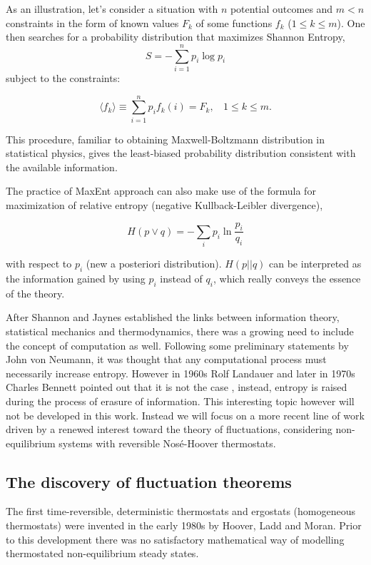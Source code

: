 \documentclass[a4paper,12pt]{article}
\begin{document}
As an illustration, let's consider a situation with $n$ potential outcomes and $m<n$ constraints in the form of known values $F_k$ of some functions $f_k$ ($1 \leq k \leq m$).
One then searches for a probability distribution that maximizes Shannon Entropy,
\begin{equation}
  S=-\sum_{i=1}^n p_i \log p_i
\end{equation}
subject to the constraints:

\begin{equation}
  \langle f_k \rangle \equiv \sum_{i=1}^n p_i f_k(i)=F_k,\ \ \ \  1\leq k \leq m.
\end{equation}

This procedure, familiar to obtaining Maxwell-Boltzmann distribution in statistical physics, gives the least-biased probability distribution consistent with the available information.

The practice of MaxEnt approach can also make use of the formula for maximization of relative entropy (negative Kullback-Leibler divergence),

\begin{equation}
\label{Kullback-Leibler}
    H(p\lor q) = -\sum_i p_i \ln \frac{p_i}{q_i}
\end{equation}


with respect to $p_i$ (new a posteriori distribution). $H(p||q)$ can be interpreted as the information gained by using $p_i$ instead of $q_i$, which really conveys the essence of the theory.


After Shannon and Jaynes established the links between information theory, statistical mechanics and thermodynamics, there was a growing need to include the concept of computation as well. Following some preliminary statements by John von Neumann, it was thought that any computational process must necessarily increase entropy.
However in 1960s Rolf Landauer and later in 1970s Charles Bennett pointed out that it is not the case \cite{Landauer:2002wc, Bennett:1973ko}, instead, entropy is raised during the process of erasure of information. This interesting topic however will not be developed in this work. Instead we will focus on a more recent line of work driven by a renewed interest toward the theory of fluctuations, considering non-equilibrium systems with reversible Nosé-Hoover thermostats.
\subsection{The discovery of fluctuation theorems}
The first time-reversible, deterministic thermostats and ergostats (homogeneous thermostats) were invented in the early 1980s by Hoover, Ladd and Moran\cite{Hoover:1982dp}. Prior to this development there was no satisfactory mathematical way of modelling thermostated non-equilibrium steady states.
\end{document}
